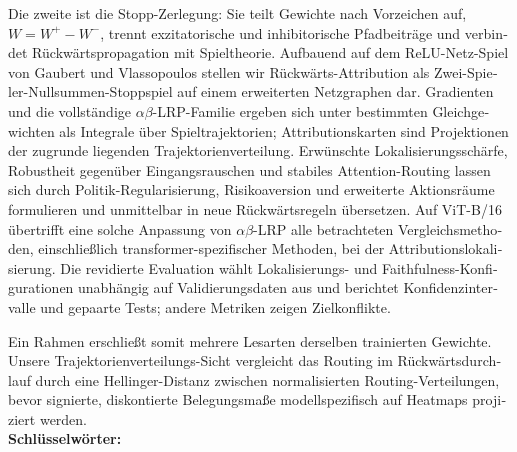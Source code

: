 \begin{otherlanguage}{ngerman}
Die zweite ist die Stopp-Zerlegung: Sie teilt Gewichte nach Vorzeichen auf, $W = W^+ - W^-$, trennt exzitatorische und inhibitorische Pfadbeitr\"age und verbindet R\"uckw\"artspropagation mit Spieltheorie. Aufbauend auf dem ReLU-Netz-Spiel von Gaubert und Vlassopoulos stellen wir R\"uckw\"arts-Attribution als Zwei-Spieler-Nullsummen-Stoppspiel auf einem erweiterten Netzgraphen dar. Gradienten und die vollst\"andige $\alpha\beta$-LRP-Familie ergeben sich unter bestimmten Gleichgewichten als Integrale \"uber Spieltrajektorien; Attributionskarten sind Projektionen der zugrunde liegenden Trajektorienverteilung. Erw\"unschte Lokalisierungssch\"arfe, Robustheit gegen\"uber Eingangsrauschen und stabiles Attention-Routing lassen sich durch Politik-Regularisierung, Risikoaversion und erweiterte Aktionsr\"aume formulieren und unmittelbar in neue R\"uckw\"artsregeln \"ubersetzen. Auf ViT-B/16 \"ubertrifft eine solche Anpassung von $\alpha\beta$-LRP alle betrachteten Vergleichsmethoden, einschlie\ss{}lich transformer-spezifischer Methoden, bei der Attributionslokalisierung. Die revidierte Evaluation w\"ahlt Lokalisierungs- und Faithfulness-Konfigurationen unabh\"angig auf Validierungsdaten aus und berichtet Konfidenzintervalle und gepaarte Tests; andere Metriken zeigen Zielkonflikte.

Ein Rahmen erschlie\ss{}t somit mehrere Lesarten derselben trainierten Gewichte. Unsere Trajektorien\-verteilungs-Sicht vergleicht das Routing im R\"uckw\"artsdurchlauf durch eine Hellinger-Distanz zwischen normalisierten Routing-Verteilungen, bevor signierte, diskontierte Belegungsmaße modellspezifisch auf Heatmaps projiziert werden.
\\[2ex]
\textbf{Schl\"usselw\"orter:} \itshape \germankeywords
\end{otherlanguage}

